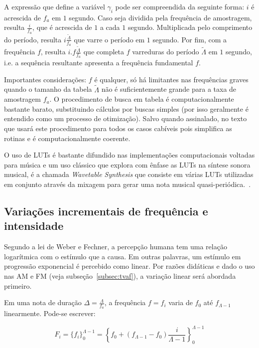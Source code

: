  A expressão que define a variável $\gamma_i$ pode ser compreendida da
 seguinte forma: $i$ é acrescida de $f_a$ em $1$ segundo.
 Caso seja dividida pela frequência de amostragem, resulta $\frac{i}{f_a}$,
que é acrescida de $1$ a cada $1$ segundo. Multiplicada pelo comprimento do período, resulta $i \frac{\widetilde{\Lambda}}{f_a}$
 que varre o 
  período em $1$ segundo. Por fim,
 com a frequência $f$, resulta $i . f \frac{\widetilde{\Lambda}}{f_a}$
 que completa $f$ varreduras do período  $\widetilde{\Lambda}$ em $1$ segundo, i.e. a sequência
 resultante apresenta a frequência fundamental $f$.

Importantes considerações: $f$ é qualquer, só há limitantes nas frequências
graves quando o tamanho da tabela $\widetilde{\Lambda}$ não é suficientemente grande para a taxa de amostragem
$f_a$. O procedimento de busca em tabela
é computacionalmente bastante barato, substituindo cálculos por buscas simples (por isso geralmente
é entendido como um processo de otimização). Salvo quando assinalado,
no texto que usará este procedimento para todos os casos cabíveis pois
simplifica as rotinas e é computacionalmente coerente.

O uso de LUTs é bastante difundido nas implementações computacionais
voltadas para música e um uso clássico que explora com ênfase
as LUTs na síntese sonora musical, é a  chamada 
\emph{Wavetable Synthesis} que consiste em várias LUTs utilizadas em 
conjunto através da mixagem para gerar uma nota musical quasi-periódica.~\cite{Cook,Wavetable}.


\subsection{Variações incrementais de frequência e intensidade}

Segundo a lei de Weber e Fechner, a percepção humana tem uma relação logarítmica com
o estímulo que a causa.\cite{Weber-Fechner} Em outras palavras, um estímulo em progressão exponencial
é percebido como linear.
Por razões didáticas e dado o uso nas AM e FM (veja subseção~\ref{subsec:tvaf}), a variação linear será abordada primeiro.

Em uma nota de duração $\Delta = \frac{\Lambda}{f_a}$, a frequência $f=f_i$ varia de $f_0$ até $f_{\Lambda -1}$
linearmente. Pode-se escrever:

\begin{equation}\label{freqLinear}
F_i=\{f_i\}_0^{\Lambda-1}=\left\{f_0 + (f_{\Lambda-1}-f_0)\frac{i}{\Lambda-1} \right\}_0^{\Lambda-1}
\end{equation}

